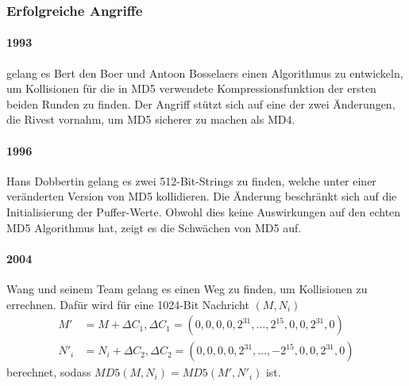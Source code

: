 \documentclass[12pt,a4paper]{scrartcl}
\numberwithin{equation}{section}
\numberwithin{myalgctr}{section}
\numberwithin{mytheoremctr}{section}
\newcommand{\mpar}[1]{\paragraph*{#1}\mbox{}\par}
\begin{document}
\subsubsection{Erfolgreiche Angriffe}
	\mpar{1993} gelang es Bert den Boer und Antoon Bosselaers einen Algorithmus zu entwickeln, um Kollisionen für die in MD5 verwendete Kompressionsfunktion der ersten beiden Runden zu finden. Der Angriff stützt sich auf eine der zwei Änderungen, die Rivest vornahm, um MD5 sicherer zu machen als MD4. \autocite[vgl.][1]{boer}
		
	\mpar{1996}\noindent
	Hans Dobbertin gelang es zwei 512-Bit-Strings zu finden, welche unter einer veränderten Version von MD5 kollidieren. Die Änderung beschränkt sich auf die Initialisierung der Puffer-Werte. Obwohl dies keine Auswirkungen auf den echten MD5 Algorithmus hat, zeigt es die Schwächen von MD5 auf.\autocite[vgl.][1]{md4Collision}
		
	\mpar{2004}\noindent
		Wang und seinem Team gelang es einen Weg zu finden, um Kollisionen zu errechnen. Dafür wird für eine 1024-Bit Nachricht $(M,N_i)$
		\begin{align*}
			M'&=M+\Delta C_1,\Delta C_1 = (0,0,0,0,2^{31},\dots ,2^{15},0,0,2^{31},0)\\
			N'_i &= N_i + \Delta C_2,\Delta C_2 = (0,0,0,0,2^{31},\dots ,-2^{15},0,0,2^{31},0)
		\end{align*}
		berechnet, sodass $MD5(M,N_i) = MD5(M',N'_i)$ ist.
		
\end{document}
